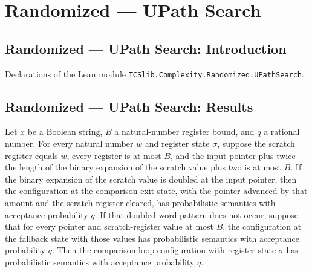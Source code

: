 \section{Randomized --- UPath Search}
\subsection*{Randomized --- UPath Search: Introduction}

Declarations of the Lean module \texttt{TCSlib.Complexity.Randomized.UPathSearch}.

\subsection*{Randomized --- UPath Search: Results}

\begin{lemma}
\label{Complexity.LogProg.ups_scmp}
\leanok
{}
Let $x$ be a Boolean string, $B$ a natural-number register bound, and $q$ a rational
number. For every natural number $w$ and register state $\sigma$, suppose the scratch
register equals $w$, every register is at most $B$, and the input pointer plus twice the
length of the binary expansion of the scratch value plus two is at most $B$. If the
binary expansion of the scratch value is doubled at the input pointer, then the
configuration at the comparison-exit state, with the pointer advanced by that amount and
the scratch register cleared, has probabilistic semantics with acceptance probability
$q$. If that doubled-word pattern does not occur, suppose that for every pointer and
scratch-register value at most $B$, the configuration at the fallback state with those
values has probabilistic semantics with acceptance probability $q$. Then the
comparison-loop configuration with register state $\sigma$ has probabilistic semantics
with acceptance probability $q$.
\end{lemma}


